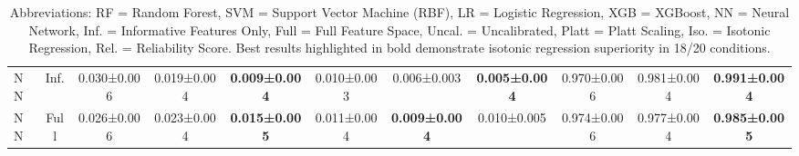 \documentclass[12pt, a4paper]{article}
\begin{document}
\begin{table}[htbp]
{\begin{tabular}{lcccccccccc}
        NN & Inf. & 0.030±0.006 & 0.019±0.004 & \textbf{0.009±0.004} & 0.010±0.003 & 0.006±0.003 & \textbf{0.005±0.004} & 0.970±0.006 & 0.981±0.004 & \textbf{0.991±0.004} \\
        NN & Full & 0.026±0.006 & 0.023±0.004 & \textbf{0.015±0.005} & 0.011±0.004 & \textbf{0.009±0.004} & 0.010±0.005 & 0.974±0.006 & 0.977±0.004 & \textbf{0.985±0.005} \\
        \bottomrule
    \end{tabular}%
    }
    \caption*{\small Abbreviations: RF = Random Forest, SVM = Support Vector Machine (RBF), LR = Logistic Regression, XGB = XGBoost, NN = Neural Network, Inf. = Informative Features Only, Full = Full Feature Space, Uncal. = Uncalibrated, Platt = Platt Scaling, Iso. = Isotonic Regression, Rel. = Reliability Score. Best results highlighted in bold demonstrate isotonic regression superiority in 18/20 conditions.}
\end{table}
\end{document}
